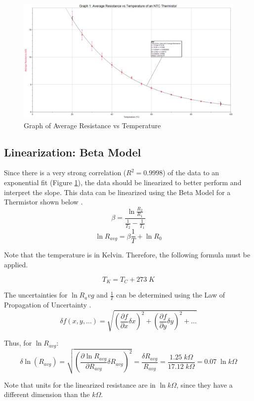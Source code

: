\begin{figure}[H]
    \centering
    \includegraphics[width=120mm,height=\textheight,keepaspectratio]{images/before_linearization.png}
    \caption{Graph of Average Resistance vs Temperature}
    \label{fig:before_linearization}
\end{figure}

\subsection{Linearization: Beta Model}
Since there is a very strong correlation ($R^2=0.9998$) of the data to an exponential fit (Figure \ref{fig:before_linearization}), the data should be linearized to better perform and interpret the slope. This data can be linearized using the Beta Model for a Thermistor shown below \citep{amethermbetamodel}.
\[\beta=\frac{\ln{\frac{R_2}{R_1}}}{\frac{1}{T_2}-\frac{1}{T_1}}\]
\[\ln{R_{avg}}=\beta\frac{1}{T}+\ln{R_0}\]

Note that the temperature is in Kelvin. Therefore, the following formula must be applied.

\[T_K=T_C+273\;K\]

The uncertainties for $\ln{R_avg}$ and $\frac{1}{T}$ can be determined using the Law of Propagation of Uncertainty \citep{taylor_1982}.
\[\delta f(x,y,\dots)=\sqrt{\left(\frac{\partial f}{\partial x}\delta x \right)^2+ \left(\frac{\partial f}{\partial y}\delta y \right)^2+\dots}\]

Thus, for $\ln{R_{avg}}$:
\[\delta \ln{(R_{avg})}=\sqrt{\left(\frac{\partial \ln{R_{avg}}}{\partial R_{avg}}\delta R_{avg} \right)^2}=\frac{\delta R_{avg}}{R_{avg}}=\frac{1.25\;k\Omega}{17.12\;k\Omega}=0.07 \;\ln{k\Omega}\]

Note that units for the linearized resistance are in $\ln{k\Omega}$, since they have a different dimension than the $k\Omega$.

